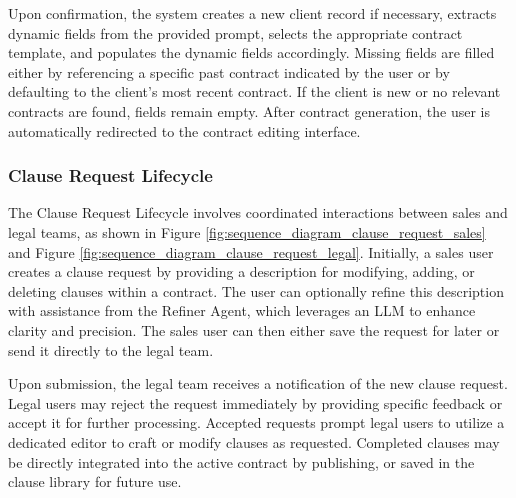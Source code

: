 Upon confirmation, the system creates a new client record if necessary, extracts dynamic fields from the provided prompt, selects the appropriate contract template, and populates the dynamic fields accordingly. Missing fields are filled either by referencing a specific past contract indicated by the user or by defaulting to the client's most recent contract. If the client is new or no relevant contracts are found, fields remain empty. After contract generation, the user is automatically redirected to the contract editing interface.

\subsubsection{Clause Request Lifecycle}

The Clause Request Lifecycle involves coordinated interactions between sales and legal teams, as shown in Figure \ref{fig:sequence_diagram_clause_request_sales} and Figure \ref{fig:sequence_diagram_clause_request_legal}. Initially, a sales user creates a clause request by providing a description for modifying, adding, or deleting clauses within a contract. The user can optionally refine this description with assistance from the Refiner Agent, which leverages an LLM to enhance clarity and precision. The sales user can then either save the request for later or send it directly to the legal team.\mynewline

Upon submission, the legal team receives a notification of the new clause request. Legal users may reject the request immediately by providing specific feedback or accept it for further processing. Accepted requests prompt legal users to utilize a dedicated editor to craft or modify clauses as requested. Completed clauses may be directly integrated into the active contract by publishing, or saved in the clause library for future use.


